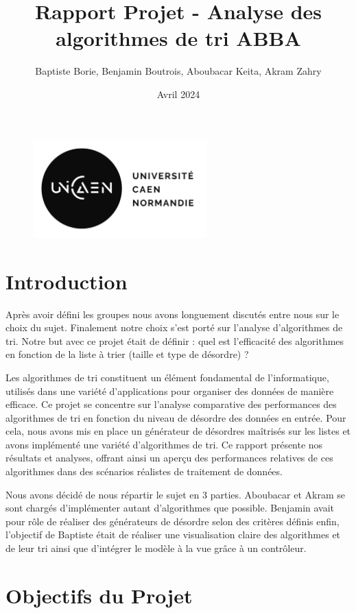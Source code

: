 \documentclass[a4paper,12pt]{article}
\title{Rapport Projet - Analyse des algorithmes de tri ABBA}
\author{Baptiste Borie, Benjamin Boutrois, Aboubacar Keita, Akram Zahry}
\date{Avril 2024}
\begin{document}
\maketitle
\begin{figure}[h]
\centering
\includegraphics[width=0.6\textwidth]{unilogo.png}
\end{figure}
\newpage
\tableofcontents
\newpage
\section{Introduction}
Après avoir défini les groupes nous avons longuement discutés entre nous sur le choix du sujet. Finalement notre choix s'est porté sur l'analyse d'algorithmes de tri. Notre but avec ce projet était de définir : quel est l'efficacité des algorithmes en fonction de la liste à trier (taille et type de désordre) ? 

Les algorithmes de tri constituent un élément fondamental de l'informatique, utilisés dans une variété d'applications pour organiser des données de manière efficace. Ce projet se concentre sur l'analyse comparative des performances des algorithmes de tri en fonction du niveau de désordre des données en entrée. Pour cela, nous avons mis en place un générateur de désordres maîtrisés sur les listes et avons implémenté une variété d'algorithmes de tri. Ce rapport présente nos résultats et analyses, offrant ainsi un aperçu des performances relatives de ces algorithmes dans des scénarios réalistes de traitement de données.


Nous avons décidé de nous répartir le sujet en 3 parties. Aboubacar et Akram se sont chargés d'implémenter autant d'algorithmes que possible. Benjamin avait pour rôle de réaliser des générateurs de désordre selon des critères définis enfin, l'objectif de Baptiste était de réaliser une visualisation claire des algorithmes et de leur tri ainsi que d'intégrer le modèle à la vue grâce à un contrôleur.

\section{Objectifs du Projet}
\end{document}
